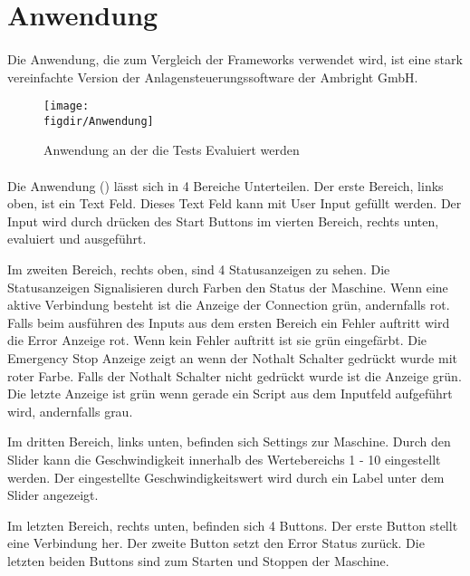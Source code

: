 		\newpage
	\section{Anwendung}
		\paragraph{} Die Anwendung, die zum Vergleich der Frameworks verwendet wird, ist eine stark vereinfachte Version der Anlagensteuerungssoftware der Ambright GmbH.  
		
		\begin{figure}[t]		
			\centering
			\texttt{[image: \\figdir/Anwendung]}
				
			\caption[Anwendung]
			{Anwendung an der die Tests Evaluiert werden}
			\label{FIG:Anwendung}
		\end{figure}
		\FloatBarrier
		
		\paragraph{} Die Anwendung () lässt sich in 4 Bereiche Unterteilen. Der erste Bereich, links oben, ist ein Text Feld. Dieses Text Feld kann mit User Input gefüllt werden. Der Input wird durch drücken des Start Buttons im vierten Bereich, rechts unten, evaluiert und ausgeführt. 
		
		Im zweiten Bereich, rechts oben, sind 4 Statusanzeigen zu sehen. Die Statusanzeigen Signalisieren durch Farben den Status der Maschine. Wenn eine aktive Verbindung besteht ist die Anzeige der Connection grün, andernfalls rot. 
		Falls beim ausführen des Inputs aus dem ersten Bereich ein Fehler auftritt wird die Error Anzeige rot. Wenn kein Fehler auftritt ist sie grün eingefärbt. 
		Die Emergency Stop Anzeige zeigt an wenn der Nothalt Schalter gedrückt wurde mit roter Farbe. Falls der Nothalt Schalter nicht gedrückt wurde ist die Anzeige grün. 
		Die letzte Anzeige ist grün wenn gerade ein Script aus dem Inputfeld aufgeführt wird, andernfalls grau.
		
		Im dritten Bereich, links unten, befinden sich Settings zur Maschine. Durch den Slider kann die Geschwindigkeit innerhalb des Wertebereichs 1 - 10 eingestellt werden. Der eingestellte Geschwindigkeitswert wird durch ein Label unter dem Slider angezeigt.
		
		Im letzten Bereich, rechts unten, befinden sich 4 Buttons. Der erste Button stellt eine Verbindung her. Der zweite Button setzt den Error Status zurück. Die letzten beiden Buttons sind zum Starten und Stoppen der Maschine.
		 

